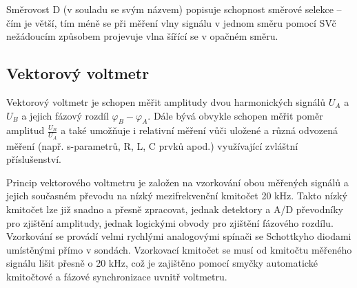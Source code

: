         Směrovost D (v souladu se svým názvem) popisuje schopnost směrové selekce – čím je větší, 
        tím méně se při měření vlny signálu v jednom směru pomocí SVč nežádoucím způsobem projevuje 
        vlna šířící se v opačném směru.
  
      \subsection{Vektorový voltmetr}
        Vektorový voltmetr je schopen měřit amplitudy dvou harmonických signálů \(U_A\) a \(U_B\) a 
        jejich fázový rozdíl \(\varphi_B - \varphi_A\). Dále bývá obvykle schopen měřit poměr 
        amplitud \(\frac{U_B}{U_A}\) a také umožňuje i relativní měření vůči uložené a různá 
        odvozená měření (např. s-parametrů, R, L, C prvků apod.) využívající zvláštní příslušenství.
  
        Princip vektorového voltmetru je založen na vzorkování obou měřených signálů a jejich 
        současném převodu na nízký mezifrekvenční kmitočet 20 kHz. Takto nízký kmitočet lze již 
        snadno a přesně zpracovat, jednak detektory a A/D převodníky pro zjištění amplitudy, jednak 
        logickými obvody pro zjištění fázového rozdílu. Vzorkování se provádí velmi rychlými 
        analogovými spínači se Schottkyho diodami umístěnými přímo v sondách. Vzorkovací kmitočet 
        se musí od kmitočtu měřeného signálu lišit přesně o 20 kHz, což je zajištěno pomocí smyčky 
        automatické kmitočtové a fázové synchronizace uvnitř voltmetru.  

\printbibliography[heading=subbibliography]
